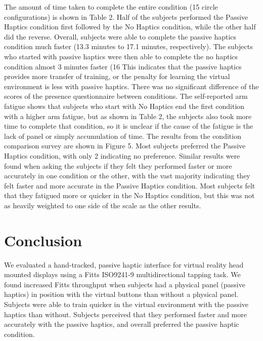 \documentclass[]{aiaa-tc}%
\begin{document}
The amount of time taken to complete the entire condition (15 circle configurations) is shown in Table 2.
Half of the subjects performed the Passive Haptics condition first followed by the No Haptics condition, while the other half did the reverse.
Overall, subjects were able to complete the passive haptics condition much faster (13.3 minutes to 17.1 minutes, respectively).
The subjects who started with passive haptics were then able to complete the no haptics condition almost 3 minutes faster (16%
This indicates that the passive haptics provides more transfer of training, or the penalty for learning the virtual environment is less with passive haptics.
There was no significant difference of the scores of the presence questionnaire between conditions.
The self-reported arm fatigue shows that subjects who start with No Haptics end the first condition with a higher arm fatigue, but as shown in Table 2, the subjects also took more time to complete that condition, so it is unclear if the cause of the fatigue is the lack of panel or simply accumulation of time.
The results from the condition comparison survey are shown in Figure 5.
Most subjects preferred the Passive Haptics condition, with only 2 indicating no preference.
Similar results were found when asking the subjects if they felt they performed faster or more accurately in one condition or the other, with the vast majority indicating they felt faster and more accurate in the Passive Haptics condition.
Most subjects felt that they fatigued more or quicker in the No Haptics condition, but this was not as heavily weighted to one side of the scale as the other results.


\section{Conclusion}
We evaluated a hand-tracked, passive haptic interface for virtual reality head mounted displays using a Fitts ISO9241-9 multidirectional tapping task.
We found increased Fitts throughput when subjects had a physical panel (passive haptics) in position with the virtual buttons than without a physical panel.
Subjects were able to train quicker in the virtual environment with the passive haptics than without.
Subjects perceived that they performed faster and more accurately with the passive haptics, and overall preferred the passive haptic condition.



%
%
\end{document}
